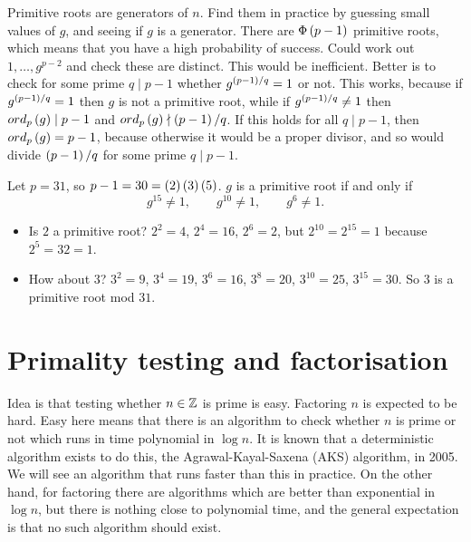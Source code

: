 
Primitive roots are generators of $ \unit{n} $. Find them in practice by guessing small values of $ g $, and seeing if $ g $ is a generator. There are $ \Phi\left( p - 1 \right) $ primitive roots, which means that you have a high probability of success. Could work out $ 1, \dots, g^{p - 2} $ and check these are distinct. This would be inefficient. Better is to check for some prime $ q \mid p - 1 $ whether $ g^{\left( p - 1 \right) / q} = 1 $ or not. This works, because if $ g^{\left( p - 1 \right) / q} = 1 $ then $ g $ is not a primitive root, while if $ g^{\left( p - 1 \right) / q} \ne 1 $ then $ ord_p\left( g \right) \mid p - 1 $ and $ ord_p\left( g \right) \nmid \left( p - 1 \right) / q $. If this holds for all $ q \mid p - 1 $, then $ ord_p\left( g \right) = p - 1 $, because otherwise it would be a proper divisor, and so would divide $ \left( p - 1 \right) / q $ for some prime $ q \mid p - 1 $.

\begin{example*}
Let $ p = 31 $, so $ p - 1 = 30 = \left( 2 \right)\left( 3 \right)\left( 5 \right) $. $ g $ is a primitive root if and only if
$$ g^{15} \ne 1, \qquad g^{10} \ne 1, \qquad g^{6} \ne 1. $$
\begin{itemize}
\item Is $ 2 $ a primitive root? $ 2^2 = 4 $, $ 2^4 = 16 $, $ 2^6 = 2 $, but $ 2^{10} = 2^{15} = 1 $ because $ 2^5 = 32 = 1 $.
\item How about $ 3 $? $ 3^2 = 9 $, $ 3^4 = 19 $, $ 3^6 = 16 $, $ 3^8 = 20 $, $ 3^{10} = 25 $, $ 3^{15} = 30 $. So $ 3 $ is a primitive root mod $ 31 $.
\end{itemize}
\end{example*}

\pagebreak

\section{Primality testing and factorisation}

Idea is that testing whether $ n \in \mathbb{Z} $ is prime is easy. Factoring $ n $ is expected to be hard. Easy here means that there is an algorithm to check whether $ n $ is prime or not which runs in time polynomial in $ \log n $. It is known that a deterministic algorithm exists to do this, the Agrawal-Kayal-Saxena (AKS) algorithm, in 2005. We will see an algorithm that runs faster than this in practice. On the other hand, for factoring there are algorithms which are better than exponential in $ \log n $, but there is nothing close to polynomial time, and the general expectation is that no such algorithm should exist.

